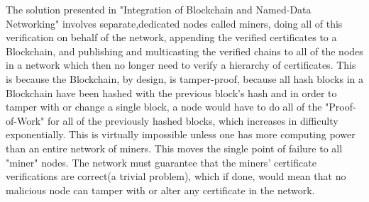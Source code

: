 The solution presented in "Integration of Blockchain and Named-Data Networking" involves separate,dedicated nodes called miners, doing all of this verification on behalf of the network, appending the verified certificates to a Blockchain, and publishing and multicasting the verified chains to all of the nodes in a network which then no longer need to verify a hierarchy of certificates. This is because the Blockchain, by design, is tamper-proof, because all hash blocks in a Blockchain have been hashed with the previous block's hash and in order to tamper with or change a single block, a node would have to do all of the "Proof-of-Work" for all of the previously hashed blocks, which increases in difficulty exponentially. This is virtually impossible unless one has more computing power than an entire network of miners. This moves the single point of failure to all "miner" nodes. The network must guarantee that the miners' certificate verifications are correct(a trivial problem), which if done, would mean that no malicious node can tamper with or alter any certificate in the network.
